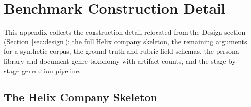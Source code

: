 %
%
%
%

\section{Benchmark Construction Detail}
\label{app:construction}

This appendix collects the construction detail relocated from the Design section
(Section~\ref{sec:design}): the full Helix company skeleton, the remaining
arguments for a synthetic corpus, the ground-truth and rubric field schemas, the
persona library and document-genre taxonomy with artifact counts, and the
stage-by-stage generation pipeline.

\subsection{The Helix Company Skeleton}
\label{app:construction:helix}

